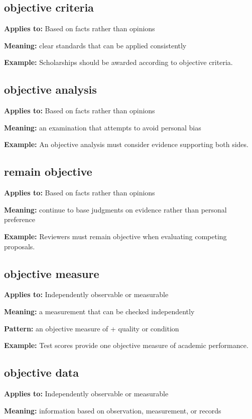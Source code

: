\documentclass[11pt]{article}
\begin{document}
\subsection{objective criteria}
\textbf{Applies to:} Based on facts rather than opinions

\textbf{Meaning:} clear standards that can be applied consistently

\textbf{Example:} Scholarships should be awarded according to objective criteria.

\subsection{objective analysis}
\textbf{Applies to:} Based on facts rather than opinions

\textbf{Meaning:} an examination that attempts to avoid personal bias

\textbf{Example:} An objective analysis must consider evidence supporting both sides.

\subsection{remain objective}
\textbf{Applies to:} Based on facts rather than opinions

\textbf{Meaning:} continue to base judgments on evidence rather than personal preference

\textbf{Example:} Reviewers must remain objective when evaluating competing proposals.

\subsection{objective measure}
\textbf{Applies to:} Independently observable or measurable

\textbf{Meaning:} a measurement that can be checked independently

\textbf{Pattern:} an objective measure of + quality or condition

\textbf{Example:} Test scores provide one objective measure of academic performance.

\subsection{objective data}
\textbf{Applies to:} Independently observable or measurable

\textbf{Meaning:} information based on observation, measurement, or records
\end{document}

